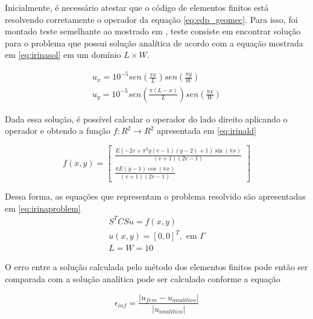 Inicialmente, é necessário atestar que o código de elementos finitos está resolvendo corretamente o operador da equação \ref{eq:edp_geomec}. 
Para isso, foi montado teste semelhante ao mostrado em \cite{irina}, teste consiste em encontrar solução para o problema que possui solução analítica de acordo com a equação mostrada em \ref{eq:irinasol} 
em um domínio $L \times W$.


\begin{equation} \label{eq:irinasol}
  \begin{aligned}
  u_x = 10^{-5} sen(\frac{\pi x}{L}) sen(\frac{\pi y}{W})  \\
  u_y = 10^{-5} sen(\frac{\pi (L-x)}{L}) sen(\frac{\pi x}{W})
  \end{aligned}
\end{equation}

Dada essa solução, é possível calcular o operador do lado direito aplicando o operador e obtendo a função $f: R^2 \rightarrow R^2$ apresentada em \ref{eq:irinald}

\begin{equation} \label{eq:irinald}
f(x, y) = 
\left[\begin{matrix}\frac{E \left(- 2 v + \pi^{2} y \left(v - 1\right) \left(y - 2\right) + 1\right) \sin{\left (\pi x \right )}}{\left(v + 1\right) \left(2 v - 1\right)} \\ \frac{\pi E \left(y - 1\right) \cos{\left (\pi x \right )}}{\left(v + 1\right) \left(2 v - 1\right)}\end{matrix}\right]
\end{equation}

Dessa forma, as equações que representam o problema resolvido são apresentadas em \ref{eq:irinaproblem}
\begin{equation}\label{eq:irinaproblem}
    \begin{aligned}
        S^T C S u = f(x, y) \\
        u(x,y) = [0, 0]^T, \text{ em } \Gamma \\
        L = W = 10
    \end{aligned}
\end{equation}


O erro entre a solução calculada pelo método dos elementos finitos pode então ser comparada
com a solução analítica pode ser calculado conforme a equação 

\begin{equation} \label{eq:erroAnalitico}
    \epsilon_{inf} =\frac{|u_{fem} - u_{analitico}|}{|u_{analitico}|}
\end{equation}

